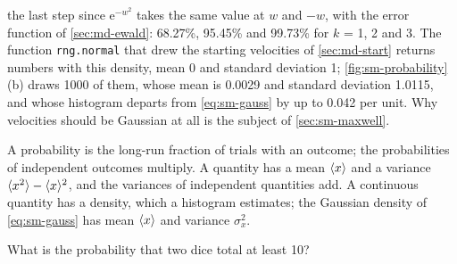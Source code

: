 the last step since $\mathrm{e}^{-w^2}$ takes the same value at $w$ and
$-w$, with the error function of \cref{sec:md-ewald}: 68.27\%, 95.45\% and
99.73\% for $k$ = 1, 2 and 3.
The function \texttt{rng.normal} that drew the starting velocities of
\cref{sec:md-start} returns numbers with this density, mean 0 and
standard deviation 1; \cref{fig:sm-probability}(b) draws 1000 of them,
whose mean is 0.0029 and standard deviation 1.0115, and whose histogram
departs from \cref{eq:sm-gauss} by up to 0.042 per unit. Why velocities
should be Gaussian at all is the subject of \cref{sec:sm-maxwell}.

\begin{keyidea}
A probability is the long-run fraction of trials with an outcome; the
probabilities of independent outcomes multiply. A quantity has a mean
$\langle x \rangle$ and a variance $\langle x^2 \rangle - \langle x \rangle^2$, and the variances of
independent quantities add. A continuous quantity has a density, which a
histogram estimates; the Gaussian density of \cref{eq:sm-gauss} has mean
$\langle x \rangle$ and variance $\sigma_x^2$.
\end{keyidea}


\begin{selfcheck}
What is the probability that two dice total at least 10?
\end{selfcheck}

